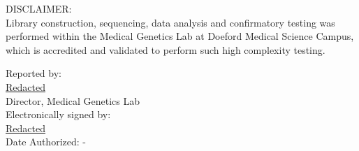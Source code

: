 \documentclass[10pt]{article}
\begin{document}
DISCLAIMER: \\
Library construction, sequencing, data analysis and confirmatory testing was performed within the Medical Genetics Lab at Doeford Medical Science Campus, which is accredited and validated to perform such high complexity testing.

\hfill \parbox{12cm}{
Reported by:\\
\underline{Redacted }\\
Director, Medical Genetics Lab \\

\vspace{1em}
Electronically signed by: \\
\underline{Redacted}\\
Date Authorized: -
}
\end{document}
